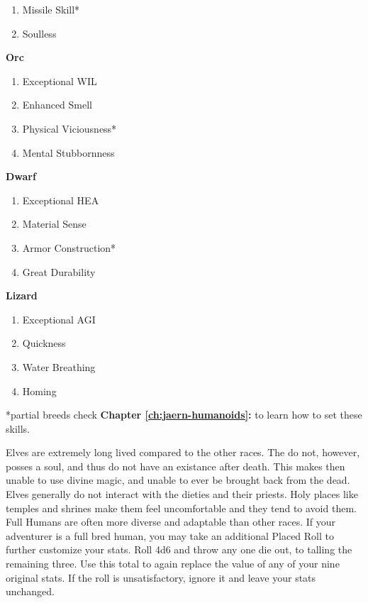 \begin{multicols*}{2}
\begin{multicols}{2}
\begin{tcolorbox}[breakable,boxrule=0pt,after skip=0pt]
\begin{enumerate}[leftmargin=0.1cm]
\item Missile Skill*
\item Soulless
\end{enumerate}
\end{tcolorbox}
\begin{tcolorbox}[breakable,boxrule=0pt,after skip=0pt]
\textbf{Orc}
\begin{enumerate}[leftmargin=0.1cm]
\item Exceptional WIL
\item Enhanced Smell
\item Physical Viciousness*
\item Mental Stubbornness
\end{enumerate}
\end{tcolorbox}
\begin{tcolorbox}[breakable,boxrule=0pt,after skip=0pt]
\textbf{Dwarf}
\begin{enumerate}[leftmargin=0.1cm]
\item Exceptional HEA
\item Material Sense
\item Armor Construction*
\item Great Durability
\end{enumerate}
\end{tcolorbox}
\begin{tcolorbox}[breakable,boxrule=0pt,after skip=0pt]
\textbf{Lizard}
\begin{enumerate}[leftmargin=0.1cm]
\item Exceptional AGI
\item Quickness
\item Water Breathing
\item Homing
\end{enumerate}
\end{tcolorbox}
\end{multicols}

*partial breeds check \textbf{Chapter \ref{ch:jaern-humanoids}: } to learn how to set these skills.

Elves are extremely long lived compared to the other races. The do not, however, posses a soul, and thus do not have an existance after death. This makes then unable to use divine magic, and unable to ever be brought back from the dead. Elves generally do not interact with the dieties and their priests. Holy places like temples and shrines make them feel uncomfortable and they tend to avoid them.\\
Full Humans are often more diverse and adaptable than other races. If your adventurer is a full bred human, you may take an additional Placed Roll to further customize your stats. Roll 4d6 and throw any one die out, to talling the remaining three. Use this total to again replace the value of any of your nine original stats. If the roll is unsatisfactory, ignore it and leave your stats unchanged.

\end{multicols*}
